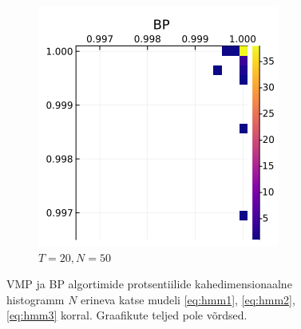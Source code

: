 \begin{figure}
\begin{subfigure}{.5\textwidth}
  \includegraphics[width=1\linewidth]{uniform_dirichlet_percs_std125_t20.png}
  \caption{$T = 20, N = 50$}
  \label{fig:sub2}
\end{subfigure}
\caption{VMP ja BP algortimide protsentiilide kahedimensionaalne histogramm $N$ erineva katse mudeli \eqref{eq:hmm1}, \eqref{eq:hmm2}, \eqref{eq:hmm3} korral. Graafikute teljed pole võrdsed.}
\label{fig:test}
\end{figure}

